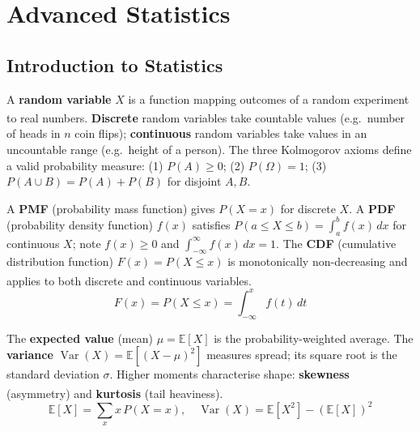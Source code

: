     \section{Advanced Statistics}
    \subsection{Introduction to Statistics}
    \begin{tcbitemize}[ skin=sectionraster ]

        \tcbitem[title={Random Variables}, raster multicolumn=6]
        A \textbf{random variable} $X$ is a function mapping outcomes of a random experiment to real numbers\textsuperscript{\cite{downeyThinkStatsExploratory2015}}. \textbf{Discrete} random variables take countable values (e.g.\ number of heads in $n$ coin flips); \textbf{continuous} random variables take values in an uncountable range (e.g.\ height of a person). The three Kolmogorov axioms define a valid probability measure: (1) $P(A) \geq 0$; (2) $P(\Omega) = 1$; (3) $P(A \cup B) = P(A) + P(B)$ for disjoint $A, B$.

        \tcbitem[title={Probability Distributions}, raster multicolumn=6]
        A \textbf{PMF} (probability mass function) gives $P(X = x)$ for discrete $X$. A \textbf{PDF} (probability density function) $f(x)$ satisfies $P(a \leq X \leq b) = \int_a^b f(x)\,dx$ for continuous $X$; note $f(x) \geq 0$ and $\int_{-\infty}^{\infty} f(x)\,dx = 1$. The \textbf{CDF} (cumulative distribution function) $F(x) = P(X \leq x)$ is monotonically non-decreasing and applies to both discrete and continuous variables\textsuperscript{\cite{brucePracticalStatisticsData2017}}.
        \tcblower
        \begin{equation}
            F(x) = P(X \leq x) = \int_{-\infty}^{x} f(t)\,dt
        \end{equation}

        \tcbitem[title={Expectation Values and Moments}, raster multicolumn=6]
        The \textbf{expected value} (mean) $\mu = \mathbb{E}[X]$ is the probability-weighted average. The \textbf{variance} $\operatorname{Var}(X) = \mathbb{E}[(X-\mu)^2]$ measures spread; its square root is the standard deviation $\sigma$. Higher moments characterise shape: \textbf{skewness} (asymmetry) and \textbf{kurtosis} (tail heaviness)\textsuperscript{\cite{downeyThinkStatsExploratory2015}}.
        \tcblower
        \begin{equation}
            \mathbb{E}[X] = \sum_x x\,P(X=x), \quad
            \operatorname{Var}(X) = \mathbb{E}[X^2] - (\mathbb{E}[X])^2
        \end{equation}


\end{tcbitemize}
